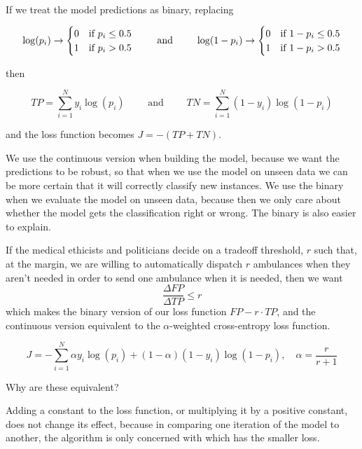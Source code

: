 \

If we treat the model predictions as binary, replacing 

$$
\log ( p_i) \to 
\begin{cases}
	0 & \text{if } p_i \le 0.5 \cr
	1 & \text{if } p_i > 0.5 \cr
\end{cases}
\qquad
\text{ and }
\qquad
\log ( 1 -  p_i) \to 
\begin{cases}
	0 & \text{if } 1 - p_i \le 0.5 \cr
	1 & \text{if } 1 - p_i > 0.5 \cr
\end{cases}
$$

then 

$$ TP = \sum_{i=1}^N y_i \log( p_i)
\qquad
\text{ and }
\qquad
TN = \sum_{i=1}^N  (1-y_i) \log( 1 - p_i)$$

and the loss function becomes $J = -(TP+TN)$.

We use the continuous version when building the model, because we want the predictions to be robust, so that when we use the model on unseen data we can be more certain that it will correctly classify new instances.  We use the binary when we evaluate the model on unseen data, because then we only care about whether the model gets the classification right or wrong.  The binary is also easier to explain.


If the medical ethicists and politicians decide on a tradeoff threshold, $r$ such that, at the margin, we are willing to automatically dispatch $r$ ambulances when they aren't needed in order to send one ambulance when it is needed, then we want $$ \frac{\Delta FP}{\Delta TP} \le r$$
which makes the binary version of our loss function $FP - r\cdot TP$, and the continuous version equivalent to the $\alpha$-weighted cross-entropy loss function.

$$J = -\sum_{i=1}^N \alpha y_i \log( p_i) + (1-\alpha)(1-y_i) \log( 1 - p_i), \quad \alpha = \frac{r}{r+1}$$

Why are these equivalent?

Adding a constant to the loss function, or multiplying it by a positive constant, does not change its effect, because in comparing one iteration of the model to another, the algorithm is only concerned with which has the smaller loss.

